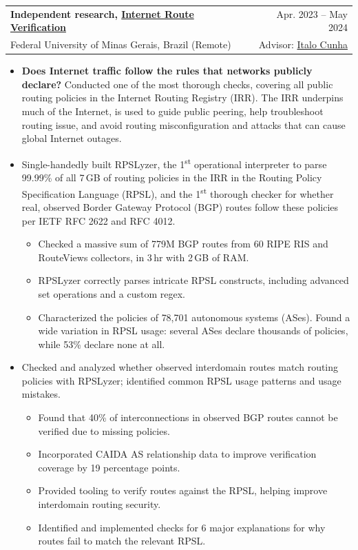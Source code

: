 \documentclass[letterpaper,11pt]{article}
\makeatletter
\newcommand{\first}{1\textsuperscript{st}}
\newcommand{\CVItem}[1]{
  \item{\small
    {#1}
  }
}
\newcommand{\CVSubheadingFrame}[1]{
  \item
    \begin{tabular*}{0.97\textwidth}[t]{l@{\extracolsep{\fill}}r}
        #1
    \end{tabular*}
}
\newcommand{\CVSubheading}[4]{\CVSubheadingFrame
    {\textbf{#1} & #2 \\
        \small#3 & #4 \\
    }}
\newcommand{\CVItemListStart}{\begin{itemize}}
\newcommand{\CVItemListEnd}{\end{itemize}}
\newcommand{\uhref}[2]{\href{#1}{\textcolor{darkbluepurple}{#2}}}
\makeatother
\begin{document}
\CVSubheading {Independent research, \uhref
    {https://github.com/SichangHe/internet_route_verification}
    {Internet Route Verification}
}{Apr.
2023 -- May 2024} {Federal University of Minas Gerais, Brazil (Remote)}
{Advisor: \uhref{https://cunha.github.io/about/}{Italo Cunha}}
\CVItemListStart
\CVItem {\textbf{Does Internet traffic follow the rules that
networks publicly declare?}
    Conducted one of the most thorough checks,
    covering all public routing policies in
    the Internet Routing Registry (IRR).
    The IRR underpins much of the Internet, is used to guide public peering,
    help troubleshoot routing issue, and avoid routing misconfiguration and
    attacks that can cause global Internet outages.
}
\CVItem {Single-handedly built RPSLyzer, the \first{} operational interpreter to
    parse 99.99\% of all 7\,GB of routing policies in the IRR in
    the Routing Policy Specification Language (RPSL), and
    the \first{} thorough checker for whether real,
    observed Border Gateway Protocol (BGP)
    routes follow these policies per IETF RFC 2622 and RFC 4012.
    \begin{itemize}
        \item Checked a massive sum of 779M BGP routes from 60 RIPE RIS and
        RouteViews collectors, in 3\,hr with 2\,GB of RAM.
        \item RPSLyzer correctly parses intricate RPSL constructs,
        including advanced set operations and a custom regex.
        \item Characterized the policies of 78,701 autonomous systems (ASes).
        Found a wide variation in RPSL usage: several ASes declare thousands of
        policies, while 53\% declare none at all.
    \end{itemize}
}
\CVItem {Checked and analyzed whether
observed interdomain routes match routing policies with RPSLyzer;
    identified common RPSL usage patterns and usage mistakes.
    \begin{itemize}
        \item Found that 40\% of interconnections in
        observed BGP routes cannot be verified due to missing policies.
        \item Incorporated CAIDA AS relationship data to
        improve verification coverage by 19 percentage points.
        \item Provided tooling to verify routes against the RPSL,
        helping improve interdomain routing security.
        \item Identified and implemented checks for 6 major explanations for
        why routes fail to match the relevant RPSL.
    \end{itemize}
}
\CVItemListEnd
\end{document}
